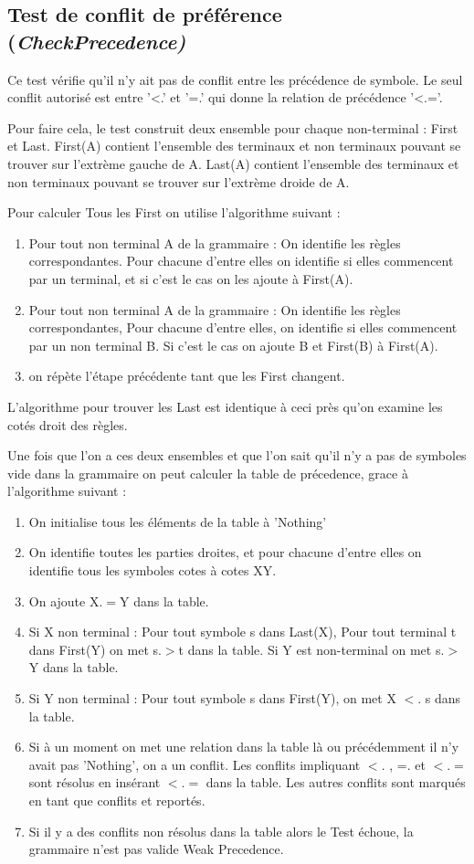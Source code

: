 	\subsection{Test de conflit de préférence (\emph{CheckPrecedence)}}
		Ce test vérifie qu'il n'y ait pas de conflit entre les précédence
		de symbole. Le seul conflit autorisé est entre '<.' et '=.' qui donne
		la relation de précédence '<.='.

		Pour faire cela, le test construit deux ensemble pour chaque non-terminal :
		First et Last. First(A) contient l'ensemble des terminaux et non terminaux 
		pouvant se trouver sur l'extrème gauche de A. Last(A) contient l'ensemble
		des terminaux et non terminaux pouvant se trouver sur l'extrème droide de A. 

		Pour calculer Tous les First on utilise l'algorithme suivant :
		\begin{enumerate}
			\item Pour tout non terminal A de la grammaire : On identifie les règles correspondantes.
			Pour chacune d'entre elles on identifie si elles commencent par un terminal, et si
			c'est le cas on les ajoute à First(A).
			\item Pour tout non terminal A de la grammaire : On identifie les règles correspondantes,
			Pour chacune d'entre elles, on identifie si elles commencent par un non terminal B.
			Si c'est le cas on ajoute B et First(B) à First(A). 
			\item on répète l'étape précédente tant que les First changent.
		\end{enumerate}
		L'algorithme pour trouver les Last est identique à ceci près qu'on examine les cotés droit des règles.
		
		Une fois que l'on a ces deux ensembles et que l'on sait qu'il n'y a pas de symboles vide dans
		la grammaire on  peut calculer la table de précedence, grace à l'algorithme suivant :
		\begin{enumerate}
			\item On initialise tous les éléments de la table à 'Nothing'
			\item On identifie toutes les parties droites, et pour chacune d'entre elles on identifie tous les
			symboles cotes à cotes XY.
			\item On ajoute X$.=$Y dans la table.
			\item Si X non terminal : Pour tout symbole s dans Last(X), Pour tout terminal t dans First(Y)
				on met s$.>$t dans la table. Si Y est non-terminal on met s$.>$Y dans la table.
			\item Si Y non terminal : Pour tout symbole s dans First(Y), on met X $<.$ s dans la table.
			\item Si à un moment on met une relation dans la table là ou précédemment il n'y avait pas 'Nothing',
				on a un conflit. Les conflits impliquant $<.$ , =. et $<.=$ sont résolus en insérant $<.=$ dans
				la table. Les autres conflits sont marqués en tant que conflits et reportés. 
			\item Si il y a des conflits non résolus dans la table alors le Test échoue, la grammaire n'est pas valide
			Weak Precedence.
		\end{enumerate}
